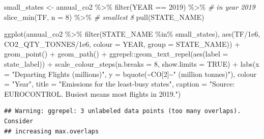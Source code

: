 \documentclass[
]{book}
\newenvironment{Shaded}{\begin{snugshade}}{\end{snugshade}}
\newcommand{\AttributeTok}[1]{\textcolor[rgb]{0.77,0.63,0.00}{#1}}
\newcommand{\CommentTok}[1]{\textcolor[rgb]{0.56,0.35,0.01}{\textit{#1}}}
\newcommand{\ConstantTok}[1]{\textcolor[rgb]{0.00,0.00,0.00}{#1}}
\newcommand{\DecValTok}[1]{\textcolor[rgb]{0.00,0.00,0.81}{#1}}
\newcommand{\FloatTok}[1]{\textcolor[rgb]{0.00,0.00,0.81}{#1}}
\newcommand{\FunctionTok}[1]{\textcolor[rgb]{0.00,0.00,0.00}{#1}}
\newcommand{\NormalTok}[1]{#1}
\newcommand{\OtherTok}[1]{\textcolor[rgb]{0.56,0.35,0.01}{#1}}
\newcommand{\SpecialCharTok}[1]{\textcolor[rgb]{0.00,0.00,0.00}{#1}}
\newcommand{\StringTok}[1]{\textcolor[rgb]{0.31,0.60,0.02}{#1}}
\begin{document}
\begin{Shaded}
\begin{Highlighting}[]
\NormalTok{small\_states }\OtherTok{\textless{}{-}}\NormalTok{ annual\_co2 }\SpecialCharTok{\%\textgreater{}\%} 
  \FunctionTok{filter}\NormalTok{(YEAR }\SpecialCharTok{==} \DecValTok{2019}\NormalTok{) }\SpecialCharTok{\%\textgreater{}\%}     \CommentTok{\#  in year 2019}
  \FunctionTok{slice\_min}\NormalTok{(TF, }\AttributeTok{n =} \DecValTok{8}\NormalTok{) }\SpecialCharTok{\%\textgreater{}\%}  \CommentTok{\# smallest 8 }
  \FunctionTok{pull}\NormalTok{(STATE\_NAME)}

\FunctionTok{ggplot}\NormalTok{(annual\_co2 }\SpecialCharTok{\%\textgreater{}\%} 
         \FunctionTok{filter}\NormalTok{(STATE\_NAME }\SpecialCharTok{\%in\%}\NormalTok{ small\_states), }
       \FunctionTok{aes}\NormalTok{(TF}\SpecialCharTok{/}\FloatTok{1e6}\NormalTok{, CO2\_QTY\_TONNES}\SpecialCharTok{/}\FloatTok{1e6}\NormalTok{, }
           \AttributeTok{colour =}\NormalTok{ YEAR, }\AttributeTok{group =}\NormalTok{ STATE\_NAME)) }\SpecialCharTok{+}
  \FunctionTok{geom\_point}\NormalTok{() }\SpecialCharTok{+} 
  \FunctionTok{geom\_path}\NormalTok{() }\SpecialCharTok{+}
\NormalTok{  ggrepel}\SpecialCharTok{::}\FunctionTok{geom\_text\_repel}\NormalTok{(}\FunctionTok{aes}\NormalTok{(}\AttributeTok{label =}\NormalTok{ state\_label)) }\SpecialCharTok{+}
  \FunctionTok{scale\_colour\_steps}\NormalTok{(}\AttributeTok{n.breaks =} \DecValTok{8}\NormalTok{, }\AttributeTok{show.limits =} \ConstantTok{TRUE}\NormalTok{) }\SpecialCharTok{+}
  \FunctionTok{labs}\NormalTok{(}\AttributeTok{x =} \StringTok{"Departing Flights (millions)"}\NormalTok{, }
       \AttributeTok{y =} \FunctionTok{bquote}\NormalTok{(}\SpecialCharTok{\textasciitilde{}}\NormalTok{CO[}\DecValTok{2}\NormalTok{]}\SpecialCharTok{\textasciitilde{}}\StringTok{" (million tonnes)"}\NormalTok{),}
       \AttributeTok{colour =} \StringTok{"Year"}\NormalTok{,}
       \AttributeTok{title =} \StringTok{"Emissions for the least{-}busy states"}\NormalTok{,}
       \AttributeTok{caption =} \StringTok{"Source: EUROCONTROL. \textquotesingle{}Busiest\textquotesingle{} means most flights in 2019."}\NormalTok{)}
\end{Highlighting}
\end{Shaded}

\begin{verbatim}
## Warning: ggrepel: 3 unlabeled data points (too many overlaps). Consider
## increasing max.overlaps
\end{verbatim}
\end{document}

